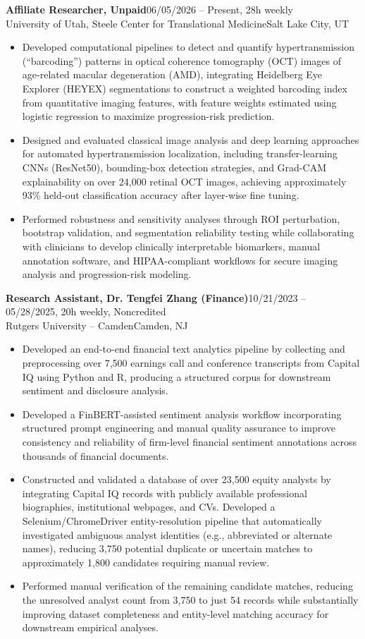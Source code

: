 \documentclass[11pt]{article}
\newcommand{\workentry}[4]{%
  \Needspace{7\baselineskip}%
  \textbf{#1}\hfill #2\\[-1pt]%
  #3\hfill #4\\[-8pt]%
}
\newenvironment{tightitemize}{%
  \vspace{-2pt}%
  \begin{itemize}[leftmargin=*,topsep=0pt,itemsep=1pt,parsep=0pt,partopsep=0pt]
}{%
  \end{itemize}\vspace{4pt}
}
\begin{document}
\workentry
{Affiliate Researcher, Unpaid}
{06/05/2026 -- Present, 28h weekly}
{University of Utah, Steele Center for Translational Medicine}
{Salt Lake City, UT}
\begin{tightitemize}
\item Developed computational pipelines to detect and quantify hypertransmission (``barcoding'') patterns in optical coherence tomography (OCT) images of age-related macular degeneration (AMD), integrating Heidelberg Eye Explorer (HEYEX) segmentations to construct a weighted barcoding index from quantitative imaging features, with feature weights estimated using logistic regression to maximize progression-risk prediction.
\item Designed and evaluated classical image analysis and deep learning approaches for automated hypertransmission localization, including transfer-learning CNNs (ResNet50), bounding-box detection strategies, and Grad-CAM explainability on over 24,000 retinal OCT images, achieving approximately 93\% held-out classification accuracy after layer-wise fine tuning.
\item Performed robustness and sensitivity analyses through ROI perturbation, bootstrap validation, and segmentation reliability testing while collaborating with clinicians to develop clinically interpretable biomarkers, manual annotation software, and HIPAA-compliant workflows for secure imaging analysis and progression-risk modeling.
\end{tightitemize}

\workentry
{Research Assistant, Dr. Tengfei Zhang (Finance)}
{10/21/2023 -- 05/28/2025, 20h weekly, Noncredited}
{Rutgers University -- Camden}
{Camden, NJ}
\begin{tightitemize}
\item Developed an end-to-end financial text analytics pipeline by collecting and preprocessing over 7,500 earnings call and conference transcripts from Capital IQ using Python and R, producing a structured corpus for downstream sentiment and disclosure analysis.
\item Developed a FinBERT-assisted sentiment analysis workflow incorporating structured prompt engineering and manual quality assurance to improve consistency and reliability of firm-level financial sentiment annotations across thousands of financial documents.
\item Constructed and validated a database of over 23,500 equity analysts by integrating Capital IQ records with publicly available professional biographies, institutional webpages, and CVs. Developed a Selenium/ChromeDriver entity-resolution pipeline that automatically investigated ambiguous analyst identities (e.g., abbreviated or alternate names), reducing 3,750 potential duplicate or uncertain matches to approximately 1,800 candidates requiring manual review.
\item Performed manual verification of the remaining candidate matches, reducing the unresolved analyst count from 3,750 to just 54 records while substantially improving dataset completeness and entity-level matching accuracy for downstream empirical analyses.
\end{tightitemize}
\end{document}
